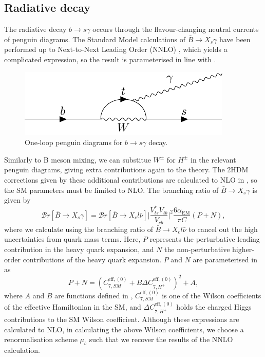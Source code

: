 \documentclass[a4paper,12pt]{article}
\begin{document}
\subsection{Radiative decay}
\label{subsec:rad}
The radiative decay $b\to s\gamma$ occurs through the flavour-changing neutral currents of penguin diagrams.
The Standard Model calculations of $\bar{B}\to X_s\gamma$ have been performed up to Next-to-Next Leading Order (NNLO) \cite{nnlo}, which yields a complicated expression, so the result is parameterised in line with \cite{desc,susy}.
\begin{figure}[H]
    \centering
    \includegraphics[width=\textwidth]{bsgam.pdf}
    \caption{\label{fig:bsgam} One-loop penguin diagrams for $b\to s\gamma$ decay.}
\end{figure}
Similarly to B meson mixing, we can substitue $W^\pm$ for $H^\pm$ in the relevant penguin diagrams, giving extra contributions again to the theory. 
The 2HDM corrections given by these additional contributions are calculated to NLO in \cite{susy}, so the SM parameters must be limited to NLO.
The branching ratio of $\bar{B}\to X_s\gamma$ is given by
\begin{equation}
    \label{eq:xsgam}
    \mathcal{B}r[\bar{B}\to X_s\gamma] = \mathcal{B}r[\bar{B}\to X_cl\bar{\nu}] \bigg|\frac{V_{ts}^*V_{tb}}{V_{cb}}\bigg|^2 \frac{6\alpha_{\text{EM}}}{\pi C}(P+N),
\end{equation}
where we calculate using the branching ratio of $\bar{B}\to X_cl\bar{\nu}$ to cancel out the high uncertainties from quark mass terms.
Here, $P$ represents the perturbative leading contribution in the heavy quark expansion, and $N$ the non-perturbative higher-order contributions of the heavy quark expansion.
$P$ and $N$ are parameterised in \cite{desc,susy} as 
\begin{equation}
    \label{eq:pplsn}
    P+N = (C^{\text{eff},(0)}_{7,SM}+B\Delta C_{7,H^+}^{\text{eff},(0)})^2+A,
\end{equation}
where $A$ and $B$ are functions defined in \cite{desc}, $C_{7,SM}^{\text{eff},(0)}$ is one of the Wilson coefficients of the effective Hamiltonian in the SM, and $\Delta C_{7,H^+}^{\text{eff},(0)}$ holds the charged Higgs contributions to the SM Wilson coefficient. 
Although these expressions are calculated to NLO, in calculating the above Wilson coefficients, we choose a renormalisation scheme $\mu_b$ such that we recover the results of the NNLO calculation. 
\end{document}
